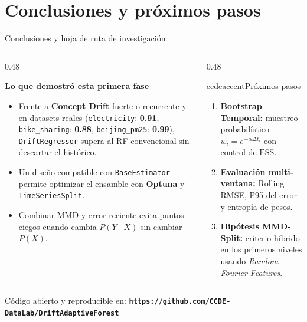 \documentclass[aspectratio=169,11pt,table]{beamer}
\begin{document}
\section{Conclusiones y próximos pasos}

\begin{frame}{Conclusiones y hoja de ruta de investigación}
\begin{columns}[T,onlytextwidth]
\begin{column}{0.48\textwidth}
\begin{ccdebox}
\scriptsize
\textbf{Lo que demostró esta primera fase}\\[0.08cm]
\begin{itemize}
  \item Frente a \textbf{Concept Drift} fuerte o recurrente y en datasets reales (\texttt{electricity}: \textbf{0.91}, \texttt{bike\_sharing}: \textbf{0.88}, \texttt{beijing\_pm25}: \textbf{0.99}), \texttt{DriftRegressor} supera al RF convencional sin descartar el histórico.
  \item Un diseño compatible con \texttt{BaseEstimator} permite optimizar el ensamble con \textbf{Optuna} y \texttt{TimeSeriesSplit}.
  \item Combinar MMD y error reciente evita puntos ciegos cuando cambia $P(Y \mid X)$ sin cambiar $P(X)$.
\end{itemize}
\end{ccdebox}
\end{column}
\begin{column}{0.48\textwidth}
\begin{contrastbox}{ccdeaccent}{Próximos pasos}
\scriptsize
\begin{enumerate}
  \item \textbf{Bootstrap Temporal:} muestreo probabilístico $w_i = e^{-\alpha \Delta t_i}$ con control de $\text{ESS}$.
  \item \textbf{Evaluación multi-ventana:} Rolling RMSE, P95 del error y entropía de pesos.
  \item \textbf{Hipótesis MMD-Split:} criterio híbrido en los primeros niveles usando \textit{Random Fourier Features}.
\end{enumerate}
\end{contrastbox}
\end{column}
\end{columns}

\vspace{0.14cm}
\begin{keybox}
\centering
\footnotesize
Código abierto y reproducible en: \textbf{\texttt{https://github.com/CCDE-DataLab/DriftAdaptiveForest}}
\end{keybox}
\end{frame}
\end{document}
